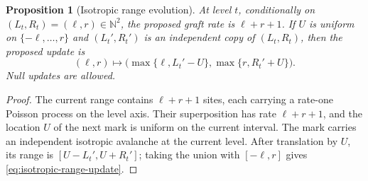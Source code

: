 \documentclass[11pt,a4paper]{amsart}
\newtheorem{proposition}[theorem]{Proposition}
\theoremstyle{remark}
\newcommand{\N}{\mathbb N}
\begin{document}
\begin{proposition}[Isotropic range evolution]
\label{prop:isotropic-range-evolution}
At level $t$, conditionally on
$(L_t,R_t)=(\ell,r)\in\N^2$, the proposed graft rate is
$\ell+r+1$. If $U$ is uniform on $\{-\ell,\ldots,r\}$ and
$(L_t',R_t')$ is an independent copy of $(L_t,R_t)$, then the proposed
update is
\begin{equation}
\label{eq:isotropic-range-update}
        (\ell,r)
        \longmapsto
        \bigl(\max\{\ell,L_t'-U\},\max\{r,R_t'+U\}\bigr).
\end{equation}
Null updates are allowed.
\end{proposition}

\begin{proof}
The current range contains $\ell+r+1$ sites, each carrying a rate-one
Poisson process on the level axis. Their superposition has rate
$\ell+r+1$, and the location $U$ of the next mark is uniform on the current
interval. The mark carries an independent isotropic avalanche at the current
level. After translation by $U$, its range is
$[U-L_t',U+R_t']$; taking the union with $[-\ell,r]$ gives
\eqref{eq:isotropic-range-update}.
\end{proof}
\end{document}
